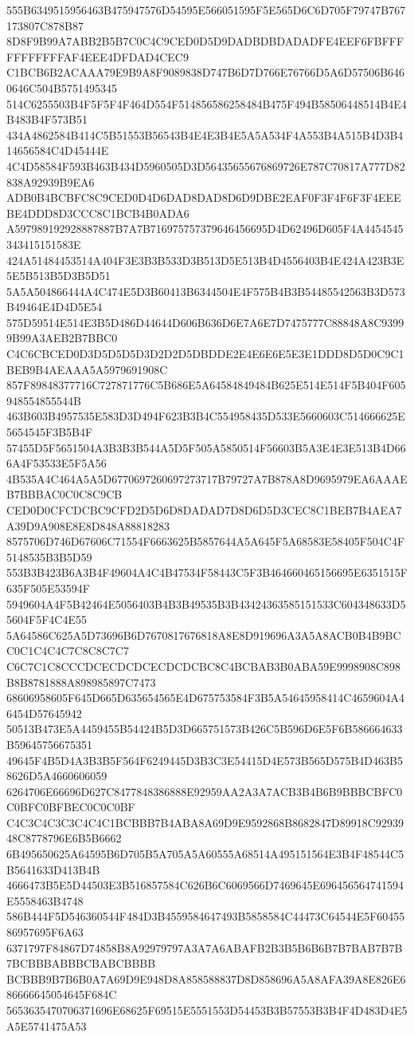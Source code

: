 {{{{{{{{{{{{{{{{{{{{{555B6349515956463B475947576D54595E566051595F5E565D6C6D705F79747B767173807C878B87
8D8F9B99A7ABB2B5B7C0C4C9CED0D5D9DADBDBDADADFE4EEF6FBFFFFFFFFFFFAF4EEE4DFDAD4CEC9
C1BCB6B2ACAAA79E9B9A8F9089838D747B6D7D766E76766D5A6D57506B6460646C504B5751495345
514C6255503B4F5F5F4F464D554F514856586258484B475F494B58506448514B4E4B483B4F573B51
434A4862584B414C5B51553B56543B4E4E3B4E5A5A534F4A553B4A515B4D3B414656584C4D45444E
4C4D58584F593B463B434D5960505D3D56435655676869726E787C70817A777D82838A92939B9EA6
ADB0B4BCBFC8C9CED0D4D6DAD8DAD8D6D9DBE2EAF0F3F4F6F3F4EEEBE4DDD8D3CCC8C1BCB4B0ADA6
A597989192928887887B7A7B716975757379646456695D4D62496D605F4A4454545343415151583E
424A51484453514A404F3E3B3B533D3B513D5E513B4D4556403B4E424A423B3E5E5B513B5D3B5D51
5A5A504866444A4C474E5D3B60413B6344504E4F575B4B3B54485542563B3D573B49464E4D4D5E54
575D59514E514E3B5D486D44644D606B636D6E7A6E7D7475777C88848A8C93999B99A3AEB2B7BBC0
C4C6CBCED0D3D5D5D5D3D2D2D5DBDDE2E4E6E6E5E3E1DDD8D5D0C9C1BEB9B4AEAAA5A5979691908C
857F89848377716C727871776C5B686E5A64584849484B625E514E514F5B404F605948554855544B
463B603B4957535E583D3D494F623B3B4C554958435D533E5660603C514666625E5654545F3B5B4F
57455D5F5651504A3B3B3B544A5D5F505A5850514F56603B5A3E4E3E513B4D666A4F53533E5F5A56
4B535A4C464A5A5D6770697260697273717B79727A7B878A8D9695979EA6AAAEB7BBBAC0C0C8C9CB
CED0D0CFCDCBC9CFD2D5D6D8DADAD7D8D6D5D3CEC8C1BEB7B4AEA7A39D9A908E8E8D848A88818283
8575706D746D67606C71554F6663625B5857644A5A645F5A68583E58405F504C4F5148535B3B5D59
553B3B423B6A3B4F49604A4C4B47534F58443C5F3B464660465156695E6351515F635F505E53594F
5949604A4F5B42464E5056403B4B3B49535B3B43424363585151533C604348633D55604F5F4C4E55
5A64586C625A5D73696B6D7670817676818A8E8D919696A3A5A8ACB0B4B9BCC0C1C4C4C7C8C8C7C7
C6C7C1C8CCCDCECDCDCECDCDCBC8C4BCBAB3B0ABA59E9998908C898B8B8781888A898985897C7473
68606958605F645D665D635654565E4D675753584F3B5A54645958414C4659604A46454D57645942
50513B473E5A4459455B54424B5D3D665751573B426C5B596D6E5F6B586664633B59645756675351
49645F4B5D4A3B3B5F564F6249445D3B3C3E54415D4E573B565D575B4D463B58626D5A4660606059
6264706E66696D627C8477848386888E92959AA2A3A7ACB3B4B6B9BBBCBFC0C0BFC0BFBEC0C0C0BF
C4C3C4C3C3C4C4C1BCBBB7B4ABA8A69D9E9592868B8682847D89918C9293948C8778796E6B5B6662
6B495650625A64595B6D705B5A705A5A60555A68514A495151564E3B4F48544C5B5641633D413B4B
4666473B5E5D44503E3B516857584C626B6C6069566D7469645E696456564741594E5558463B4748
586B444F5D546360544F484D3B4559584647493B5858584C44473C64544E5F6045586957695F6A63
6371797F84867D74858B8A92979797A3A7A6ABAFB2B3B5B6B6B7B7BAB7B7B7BCBBBABBBCBABCBBBB
BCBBB9B7B6B0A7A69D9E948D8A858588837D8D858696A5A8AFA39A8E826E686666645054645F684C
5653635470706371696E68625F69515E5551553D54453B3B57553B3B4F4D483D4E5A5E5741475A53
}}}}}}}}}}}}}}}}}}}}}
